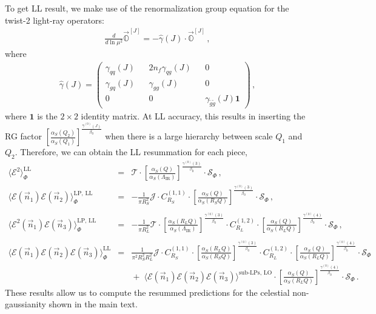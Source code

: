 \documentclass[letterpaper,11pt]{article}
\begin{document}
To get LL result, we make use of the renormalization group equation for the twist-2 light-ray operators:
%
\begin{align}\label{eq:resum}
\frac{d}{d\ln \mu^2} \vec {\mathbb{O}}^{[J]} = - \hat \gamma(J) \cdot  \vec {\mathbb{O}}^{[J]}\,, 
\end{align}
where
\begin{align}\label{eq:anom_dim}
\hat \gamma(J)=
\begin{pmatrix}
\gamma_{qq}(J)&&2n_f \gamma_{qg}(J)&&0\\
\gamma_{gq}(J)&& \gamma_{gg}(J)&&0\\
0&&0&& \gamma_{\tilde g \tilde g}(J)\mathbf{1}
\end{pmatrix}\,,
\end{align}
where $\mathbf{1}$ is the $2\times 2$ identity matrix.
%
At LL accuracy, this results in inserting the RG factor $\displaystyle \left[\frac{\alpha_S(Q_2)}{\alpha_S(Q_1)}\right]^{\frac{\hat\gamma^{(0)}(J)}{\beta_0}}$ when there is a large hierarchy between scale $Q_1$ and $Q_2$. Therefore, we can obtain the LL resummation for each piece, 
\begin{eqnarray}
\langle \mathcal{E}^2\rangle_\Phi^{\mathrm{LL}} 
&=&\mathcal{T}\cdot
\left[\frac{\alpha_S(Q)}{\alpha_S(\Lambda_{\mathrm{IR}})}\right]^{\frac{\gamma^{(0)}(3)}{\beta_0}}
\cdot \mathcal{S}_\Phi\,, \\
\langle \mathcal{E}(\vec{n}_1) \mathcal{E}(\vec{n}_2) \rangle_\Phi^{\mathrm{LP,\, LL}} 
&=& -\frac{1}{\pi R_S^2}\mathcal{J}\cdot C_{R_S}^{(1,1)}\cdot
\left[\frac{\alpha_S(Q)}{\alpha_S(R_S Q)}\right]^{\frac{\gamma^{(0)}(3)}{\beta_0}}
\cdot \mathcal{S}_\Phi \,,\\
\nonumber \\
\langle\mathcal{E}^2(\vec{n}_1)\mathcal{E}(\vec{n}_3)\rangle_\Phi^{\mathrm{LP,\, LL}}
&=& -\frac{1}{\pi R_L^2}\mathcal{T}\cdot
\left[\frac{\alpha_S(R_L Q)}{\alpha_S(\Lambda_{\mathrm{IR}})}\right]^{\frac{\gamma^{(0)}(3)}{\beta_0}}
\cdot C_{R_L}^{(1,2)} \cdot
\left[\frac{\alpha_S(Q)}{\alpha_S(R_L Q)}\right]^{\frac{\gamma^{(0)}(4)}{\beta_0}}
\cdot \mathcal{S}_\Phi\,,\\
\nonumber \\
\langle \mathcal{E}(\vec{n}_1) \mathcal{E}(\vec{n}_2) \mathcal{E}(\vec{n}_3) \rangle_{\Phi}^{\mathrm{LL}}
&=& \frac{1}{\pi^2 R_S^2 R_L^2} {\mathcal{J}}\cdot {C}_{R_S}^{(1,1)}\cdot
\left[\frac{\alpha_S(R_L Q)}{\alpha_S(R_S Q)}\right]^{\frac{\gamma^{(0)}(3)}{\beta_0}}
\cdot {C}_{R_L}^{(1,2)}\cdot
\left[\frac{\alpha_S(Q)}{\alpha_S(R_L Q)}\right]^{\frac{\gamma^{(0)}(4)}{\beta_0}}
\cdot \mathcal{S}_\Phi
\nonumber\\
&&\!\!\! +\; \langle \mathcal{E}(\vec{n}_1) \mathcal{E}(\vec{n}_2) \mathcal{E}(\vec{n}_3) \rangle^{\mathrm{sub\text{-}LPs,\, LO}} \cdot 
\left[\frac{\alpha_S(Q)}{\alpha_S(R_L Q)}\right]^{\frac{\gamma^{(0)}(4)}{\beta_0}}\cdot \mathcal{S}_\Phi\,.
\end{eqnarray}
These results allow us to compute the resummed predictions for the celestial non-gaussianity shown in the main text.
\end{document}
